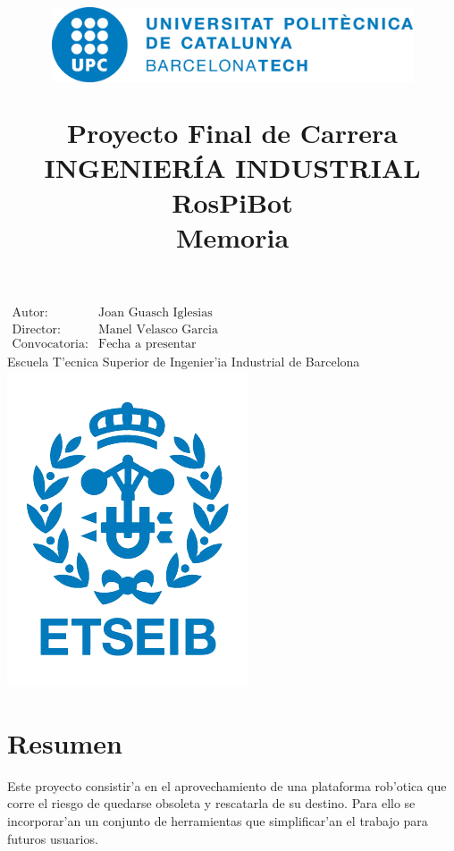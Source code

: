 \documentclass[twoside]{article}
\title{\begin{center} 
\includegraphics[width=0.8\textwidth]{images/upc-logo.png} 
\end{center} 
\vspace{0.5cm} 
Proyecto Final de Carrera\\
INGENIER\'IA INDUSTRIAL \\
\vspace{0.5cm} 
\Huge{
RosPiBot}
\vspace{0.5cm} \\
 Memoria}
\author{}
\date{} %
\begin{document}

\maketitle
\begin{center}
\large{$\begin{array}{ll}
\mbox{Autor:} & \mbox{Joan Guasch Iglesias} \\
\mbox{Director:} & \mbox{Manel Velasco Garcia} \\
\mbox{Convocatoria:} & \mbox{Fecha a presentar}
\end{array}$}\\ 
\vspace{2cm} 
\Large{Escuela T'ecnica Superior de Ingenier'ia Industrial de Barcelona}\\ \vspace{1cm}
\includegraphics[scale=1]{images/etseib-logo.png}
\end{center}
\thispagestyle{empty}
\newpage

\thispagestyle{empty}
\paragraph*{}
\newpage

\section*{Resumen}
Este proyecto consistir'a en el aprovechamiento de una plataforma rob'otica que corre el riesgo de quedarse obsoleta y rescatarla de su destino. Para ello se incorporar'an un conjunto de herramientas que simplificar'an el trabajo para futuros usuarios.
\newpage
\end{document}
